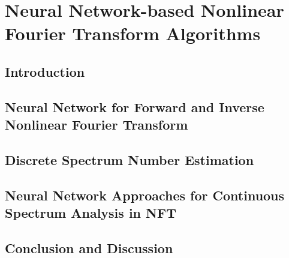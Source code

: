 \chapter{Neural Network-based Nonlinear Fourier Transform Algorithms}

\section{Introduction}


\section{Neural Network for Forward and Inverse Nonlinear Fourier Transform}


\section{Discrete Spectrum Number Estimation}



\section{Neural Network Approaches for Continuous Spectrum Analysis in NFT}





\section{Conclusion and Discussion}






